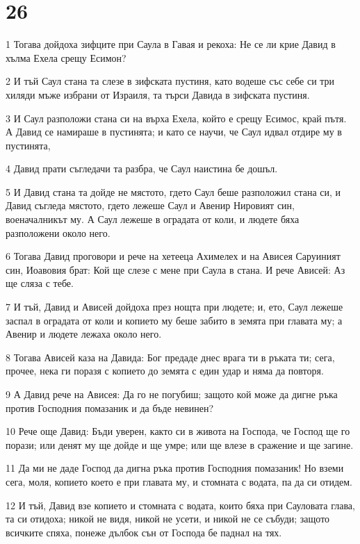 \chapter{26}

\par 1 Тогава дойдоха зифците при Саула в Гавая и рекоха: Не се ли крие Давид в хълма Ехела срещу Есимон?
\par 2 И тъй Саул стана та слезе в зифската пустиня, като водеше със себе си три хиляди мъже избрани от Израиля, та търси Давида в зифската пустиня.
\par 3 И Саул разположи стана си на върха Ехела, който е срещу Есимос, край пътя. А Давид се намираше в пустинята; и като се научи, че Саул идвал отдире му в пустинята,
\par 4 Давид прати съгледачи та разбра, че Саул наистина бе дошъл.
\par 5 И Давид стана та дойде не мястото, гдето Саул беше разположил стана си, и Давид съгледа мястото, гдето лежеше Саул и Авенир Нировият син, военачалникът му. А Саул лежеше в оградата от коли, и людете бяха разположени около него.
\par 6 Тогава Давид проговори и рече на хетееца Ахимелех и на Ависея Саруиният син, Иоавовия брат: Кой ще слезе с мене при Саула в стана. И рече Ависей: Аз ще сляза с тебе.
\par 7 И тъй, Давид и Ависей дойдоха през нощта при людете; и, ето, Саул лежеше заспал в оградата от коли и копието му беше забито в земята при главата му; а Авенир и людете лежаха около него.
\par 8 Тогава Ависей каза на Давида: Бог предаде днес врага ти в ръката ти; сега, прочее, нека ги поразя с копието до земята с един удар и няма да повторя.
\par 9 А Давид рече на Ависея: Да го не погубиш; защото кой може да дигне ръка против Господния помазаник и да бъде невинен?
\par 10 Рече още Давид: Бъди уверен, както си в живота на Господа, че Господ ще го порази; или денят му ще дойде и ще умре; или ще влезе в сражение и ще загине.
\par 11 Да ми не даде Господ да дигна ръка против Господния помазаник! Но вземи сега, моля, копието което е при главата му, и стомната с водата, па да си отидем.
\par 12 И тъй, Давид взе копието и стомната с водата, които бяха при Сауловата глава, та си отидоха; никой не видя, никой не усети, и никой не се събуди; защото всичките спяха, понеже дълбок сън от Господа бе паднал на тях.

